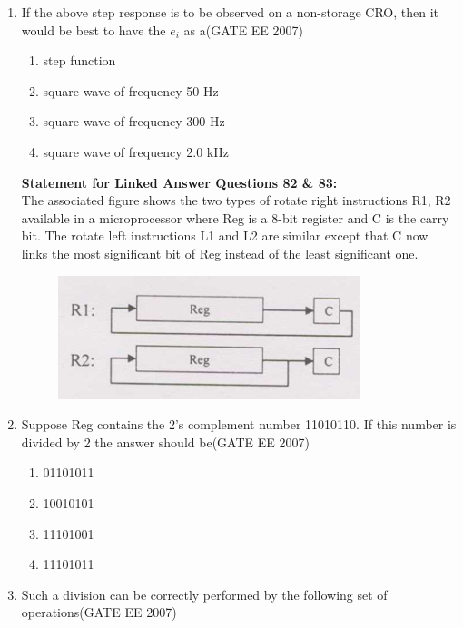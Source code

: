\documentclass[a4paper,10pt]{exam}
\theoremstyle{remark}
\begin{document}
\begin{enumerate}
\item  If the above step response is to be observed on a non-storage CRO, then it would be best to have the $e_i$ as a\hfill{(GATE EE 2007)}

\begin{multicols}{2}
\begin{enumerate}
 \item  step function 
\item square wave of frequency 50 Hz 
\item  square wave of frequency 300 Hz 
\item  square wave of frequency 2.0 kHz
\end{enumerate}
\end{multicols}

\vfill
{}
\newpage


\noindent
\textbf{Statement for Linked Answer Questions 82 \& 83:}\\
The associated figure shows the two types of rotate right instructions R1, R2 available in a microprocessor where Reg is a 8-bit register and C is the carry bit. The rotate left instructions L1 and L2 are similar except that C now links the most significant bit of Reg instead of the least significant one.

\vspace{0.5em}

\begin{figure}[H]
    \centering
    \includegraphics[width=0.5\linewidth]{figs/Q 82,83.png}
\end{figure}

\item 
Suppose Reg contains the 2's complement number 11010110. If this number is divided by 2 the answer should be\hfill{(GATE EE 2007)}

\begin{multicols}{4}
\begin{enumerate}
    \item  01101011 
 \item  10010101 
 \item  11101001 
 \item  11101011 
\end{enumerate}
\end{multicols}
\item  Such a division can be correctly performed by the following set of operations\hfill{(GATE EE 2007)}


\end{enumerate}
\end{document}
